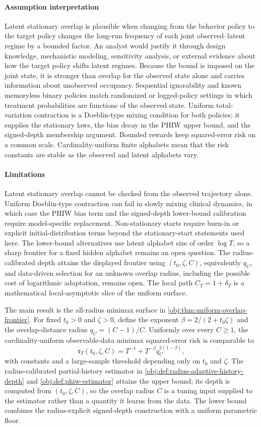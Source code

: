 \paragraph{Assumption interpretation}
Latent stationary overlap is plausible when changing from the behavior policy to the target policy changes the long-run frequency of each joint observed--latent regime by a bounded factor. An analyst would justify it through design knowledge, mechanistic modeling, sensitivity analysis, or external evidence about how the target policy shifts latent regimes. Because the bound is imposed on the joint state, it is stronger than overlap for the observed state alone and carries information about unobserved occupancy. Sequential ignorability and known memoryless binary policies match randomized or logged-policy settings in which treatment probabilities are functions of the observed state. Uniform total-variation contraction is a Doeblin-type mixing condition for both policies; it supplies the stationary laws, the bias decay in the PHIW upper bound, and the signed-depth membership argument. Bounded rewards keep squared-error risk on a common scale. Cardinality-uniform finite alphabets mean that the risk constants are stable as the observed and latent alphabets vary.

\paragraph{Limitations}
Latent stationary overlap cannot be checked from the observed trajectory alone. Uniform Doeblin-type contraction can fail in slowly mixing clinical dynamics, in which case the PHIW bias term and the signed-depth lower-bound calibration require model-specific replacement. Non-stationary starts require burn-in or explicit initial-distribution terms beyond the stationary-start statements used here. The lower-bound alternatives use latent alphabet size of order \(\log T\), so a sharp frontier for a fixed hidden alphabet remains an open question. The radius-calibrated depth attains the displayed frontier using \((t_0,\zeta,C)\), equivalently \(q_C\), and data-driven selection for an unknown overlap radius, including the possible cost of logarithmic adaptation, remains open. The local path \(C_T=1+\delta_T\) is a mathematical local-asymptotic slice of the uniform surface.

The main result is the all-radius minimax surface in \cref{obj:thm:uniform-overlap-frontier}. For fixed \(t_0>0\) and \(\zeta>0\), define the exponent \(\beta=2/(2+t_0\zeta)\) and the overlap-distance radius \(q_C=(C-1)/C\). Uniformly over every \(C\ge1\), the cardinality-uniform observable-data minimax squared-error risk is comparable to
\[
\mathfrak r_T(t_0,\zeta,C)
=
T^{-1}+T^{-\beta}q_C^{2(1-\beta)},
\]
with constants and a large-sample threshold depending only on \(t_0\) and \(\zeta\). The radius-calibrated partial-history estimator in \cref{obj:def:radius-adaptive-history-depth} and \cref{obj:def:phiw-estimator} attains the upper bound; its depth is computed from \((t_0,\zeta,C)\), so the overlap radius \(C\) is a tuning input supplied to the estimator rather than a quantity it learns from the data. The lower bound combines the radius-explicit signed-depth construction with a uniform parametric floor.

